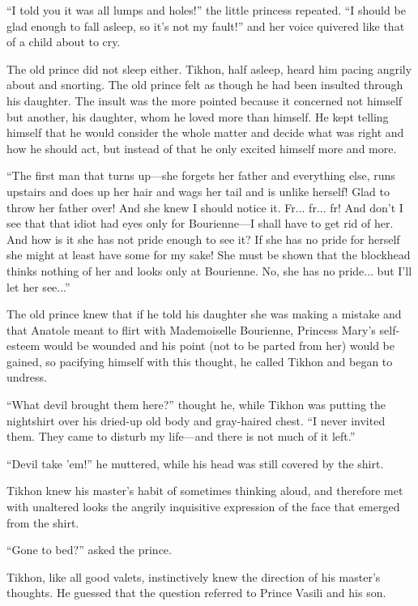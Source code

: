 ``I told you it was all lumps and holes!'' the little princess
repeated.  ``I should be glad enough to fall asleep, so it's not
my fault!'' and her voice quivered like that of a child about to
cry.

The old prince did not sleep either. Tikhon, half asleep, heard
him pacing angrily about and snorting. The old prince felt as
though he had been insulted through his daughter. The insult was
the more pointed because it concerned not himself but another,
his daughter, whom he loved more than himself. He kept telling
himself that he would consider the whole matter and decide what
was right and how he should act, but instead of that he only
excited himself more and more.

``The first man that turns up---she forgets her father and
everything else, runs upstairs and does up her hair and wags her
tail and is unlike herself! Glad to throw her father over! And
she knew I should notice it.  Fr... fr... fr! And don't I see
that that idiot had eyes only for Bourienne---I shall have to get
rid of her. And how is it she has not pride enough to see it? If
she has no pride for herself she might at least have some for my
sake! She must be shown that the blockhead thinks nothing of her
and looks only at Bourienne. No, she has no pride... but I'll let
her see...''

The old prince knew that if he told his daughter she was making a
mistake and that Anatole meant to flirt with Mademoiselle
Bourienne, Princess Mary's self-esteem would be wounded and his
point (not to be parted from her) would be gained, so pacifying
himself with this thought, he called Tikhon and began to undress.

``What devil brought them here?'' thought he, while Tikhon was
putting the nightshirt over his dried-up old body and gray-haired
chest. ``I never invited them. They came to disturb my life---and
there is not much of it left.''

``Devil take 'em!'' he muttered, while his head was still covered
by the shirt.

Tikhon knew his master's habit of sometimes thinking aloud, and
therefore met with unaltered looks the angrily inquisitive
expression of the face that emerged from the shirt.

``Gone to bed?'' asked the prince.

Tikhon, like all good valets, instinctively knew the direction of
his master's thoughts. He guessed that the question referred to
Prince Vasili and his son.

